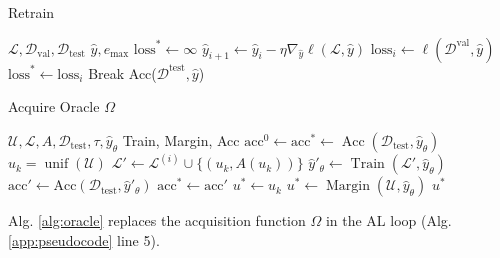 \documentclass[]{article}
\newcommand{\D}{\mathcal{D}}
\newcommand{\U}{\mathcal{U}}
\newcommand{\LL}{\mathcal{L}}
\newcommand{\test}{\text{test}}
\begin{document}
\begin{algorithm}[H]
	\caption{Retrain}\label{alg:retrain}
	\begin{algorithmic}[1]
		\Require $\LL, \D_\text{val}, \D_\text{test}$
		\Require $\hat y, e_\text{max}$
		\State $\text{loss}^* \gets \infty$
		\State $\hat y_{i+1} \gets \hat y_i - \eta \nabla_{\hat y} \ell(\mathcal{L}, \hat y)$
		\State $\text{loss}_i \gets \ell(\mathcal{D}^\text{val}, \hat y)$
		\State $\text{loss}^* \gets \text{loss}_i$
		\Else
		\State Break
		\EndIf
		\EndFor
		\State
		\Return Acc($\mathcal{D}^\text{test}, \hat y$)
	\end{algorithmic}
\end{algorithm}

\begin{algorithm}[H]
\caption{Acquire Oracle $\Omega$}\label{alg:oracle}
\begin{algorithmic}[1]
    \Require $\mathcal{U}, \mathcal{L}, A, \mathcal{D}_\text{test}, \tau, \hat y_\theta$ 
    \Require Train, Margin, Acc
    \State $\text{acc}^0 \gets \text{acc}^* \gets \operatorname{Acc}(\mathcal{D}_\text{test}, \hat y_\theta)$ 
        \State $u_k = \operatorname{unif}(\U)$
    \State $\mathcal{L}' \gets \mathcal{L}^{(i)} \cup \{(u_k, A(u_k))\}$
    \State $\hat y'_\theta \gets \operatorname{Train}(\mathcal{L}', \hat y_\theta)$
        \State $\text{acc}' \gets \text{Acc}(\D_\test, \hat y'_\theta)$
    \State $\text{acc}^* \gets \text{acc}'$
    \State $u^* \gets u_k$
    \EndIf
    \EndFor
    \State $u^* \gets \operatorname{Margin}(\mathcal{U}, \hat y_\theta)$
    \EndIf
    \Return $u^*$
\end{algorithmic}
\end{algorithm}
Alg. \ref{alg:oracle} replaces the acquisition function $\Omega$ in the AL loop (Alg. \ref{app:pseudocode} line 5). 
 
\end{document}
